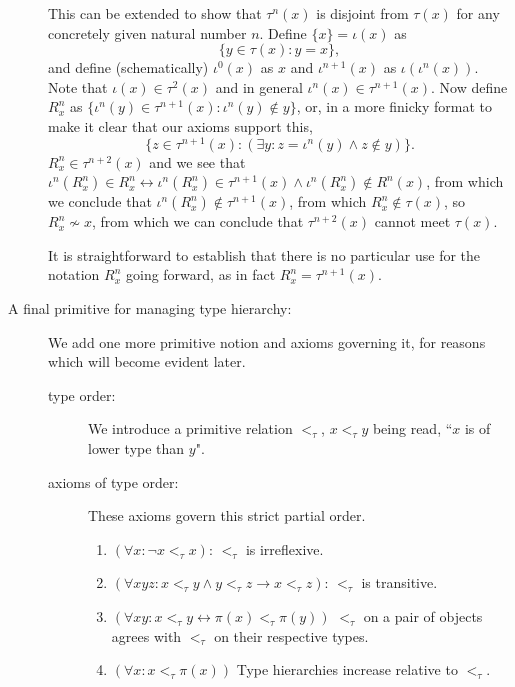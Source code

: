 \documentclass[12pt]{article}
\begin{document}
\begin{description}
This can be extended to show that $\tau^n(x)$ is disjoint from $\tau(x)$ for any concretely given natural number $n$.
Define $\{x\} = \iota(x)$ as $$\{y \in \tau(x):y=x\},$$ and define (schematically) $\iota^0(x)$ as $x$ and $\iota^{n+1}(x)$ as $\iota(\iota^n(x))$.  Note that $\iota(x) \in \tau^2(x)$ and in general $\iota^n(x) \in \tau^{n+1}(x)$.  Now define $R^n_x$ as $\{\iota^n(y) \in \tau^{n+1}(x):\iota^n(y) \not\in y\}$, or, in a more finicky format to make it clear that our axioms support this,  $$\{z\in \tau^{n+1}(x):(\exists y: z=\iota^n(y)\wedge z \not\in y)\}.$$ $R^n_x \in \tau^{n+2}(x)$
and we see that $\iota^n(R^n_x) \in R^n_x \leftrightarrow \iota^n(R^n_x) \in \tau^{n+1}(x) \wedge \iota^n(R^n_x) \not\in R^n(x)$, from which we conclude that $\iota^n(R^n_x) \not\in \tau^{n+1}(x)$, from which $R^n_x \not\in \tau(x)$, so $R^n_x \not\sim x$, from which we can conclude that $\tau^{n+2}(x)$ cannot meet $\tau(x)$.

It is straightforward to establish that there is no particular use for the notation $R^n_x$ going forward, as in fact $R^n_x = \tau^{n+1}(x)$.


\item[A final primitive for managing type hierarchy:]  We add one more primitive notion and axioms governing it, for reasons which will become evident later.

\begin{description}

\item[type order:]  We introduce a primitive relation $<_\tau$, $x <_\tau y$ being read, ``$x$ is of lower type than $y$".

\item[axioms of type order:]

These axioms govern this strict partial order.

\begin{enumerate}


\item $(\forall x:\neg x <_\tau x)$:  $<_\tau$ is irreflexive.

\item $(\forall xyz:x<_\tau y \wedge y <_\tau z \rightarrow x <_\tau z)$:  $<_\tau$ is transitive.

\item $(\forall xy: x <_\tau y \leftrightarrow \pi(x) <_\tau \pi(y))$  $<_\tau$ on a pair of objects agrees with $<_\tau$ on their respective types.

\item $(\forall x:x <_\tau \pi(x))$  Type hierarchies increase relative to $<_\tau$.


\end{enumerate}
\end{description}
\end{description}
\end{document}
